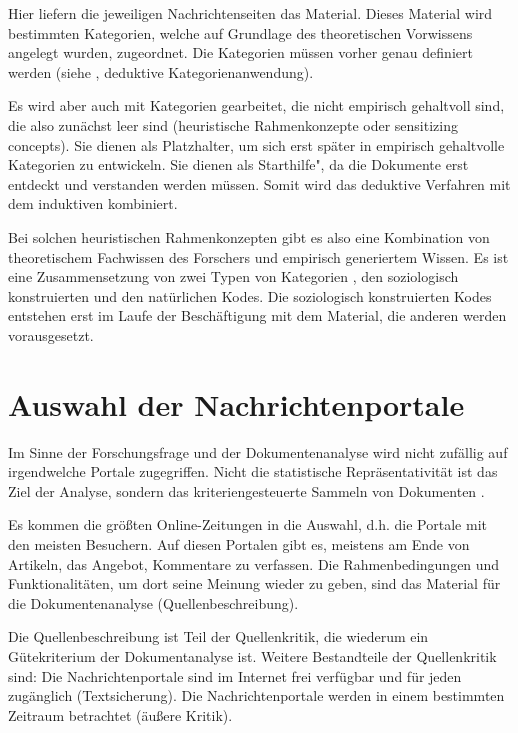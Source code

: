 Hier liefern die jeweiligen Nachrichtenseiten das Material. Dieses Material wird
bestimmten Kategorien, welche auf Grundlage des theoretischen Vorwissens
angelegt wurden, zugeordnet. Die Kategorien müssen vorher genau definiert werden
(siehe \textcite{mayring}, deduktive Kategorienanwendung).

Es wird aber auch mit Kategorien gearbeitet, die nicht empirisch gehaltvoll
sind, die also zunächst \glqq leer\grqq{} sind (\glqq heuristische
Rahmenkonzepte\grqq{} oder \glqq sensitizing concepts\grqq{}).  Sie dienen als
\glqq Platzhalter\grqq{}, um sich erst später in empirisch gehaltvolle
Kategorien zu entwickeln. Sie dienen als \glqq Starthilfe", da die Dokumente
erst entdeckt und verstanden werden müssen. Somit wird das deduktive Verfahren
mit dem induktiven kombiniert.

Bei solchen heuristischen Rahmenkonzepten gibt es also eine Kombination von
theoretischem \glqq Fachwissen des Forschers\grqq{} \autocite[S.~65]{strauss}
und empirisch generiertem Wissen. Es ist eine Zusammensetzung von zwei Typen von
Kategorien \autocite[S.~64f]{strauss}, den soziologisch konstruierten und den
natürlichen Kodes. Die soziologisch konstruierten Kodes entstehen erst im Laufe
der Beschäftigung mit dem Material, die anderen werden vorausgesetzt.


\section{Auswahl der Nachrichtenportale}

Im Sinne der Forschungsfrage und der Dokumentenanalyse wird nicht zufällig auf
irgendwelche Portale zugegriffen. Nicht die statistische Repräsentativität ist
das Ziel der Analyse, sondern das kriteriengesteuerte Sammeln von Dokumenten
\autocite{kunzler}.

Es kommen die \glqq größten\grqq{} Online-Zeitungen in die Auswahl, d.h. die
Portale mit den meisten Besuchern. Auf diesen Portalen gibt es, meistens am Ende
von Artikeln, das Angebot, Kommentare zu verfassen. Die Rahmenbedingungen und
Funktionalitäten, um dort seine Meinung wieder zu geben, sind das Material für
die Dokumentenanalyse (Quellenbeschreibung).

Die Quellenbeschreibung ist Teil der Quellenkritik, die wiederum ein
Gütekriterium der Dokumentanalyse ist. Weitere Bestandteile der Quellenkritik
sind: Die Nachrichtenportale sind im Internet frei verfügbar und für jeden
zugänglich (Textsicherung). Die Nachrichtenportale werden in einem bestimmten
Zeitraum betrachtet (äußere Kritik).

